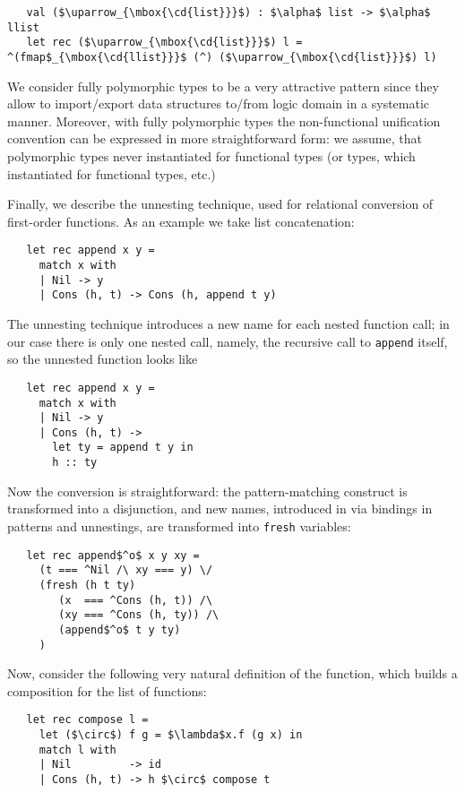 \begin{lstlisting}
   val ($\uparrow_{\mbox{\cd{list}}}$) : $\alpha$ list -> $\alpha$ llist
   let rec ($\uparrow_{\mbox{\cd{list}}}$) l = ^(fmap$_{\mbox{\cd{llist}}}$ (^) ($\uparrow_{\mbox{\cd{list}}}$) l)
\end{lstlisting}

We consider fully polymorphic types to be a very attractive pattern since they allow to import/export
data structures to/from logic domain in a systematic manner. Moreover, with fully polymorphic types the non-functional
unification convention can be expressed in more straightforward form: we assume, that polymorphic types never
instantiated for functional types (or types, which instantiated for functional types, etc.)

Finally, we describe the unnesting technique, used for relational conversion of first-order functions. As an example we take
list concatenation:

\begin{lstlisting}
   let rec append x y =
     match x with
     | Nil -> y
     | Cons (h, t) -> Cons (h, append t y)
\end{lstlisting}

The unnesting technique introduces a new name for each nested function call; in our case there is only one nested call, namely,
the recursive call to \lstinline|append| itself, so the unnested function looks like

\begin{lstlisting}
   let rec append x y =
     match x with 
     | Nil -> y
     | Cons (h, t) -> 
       let ty = append t y in
       h :: ty
\end{lstlisting}

Now the conversion is straightforward: the pattern-matching construct is transformed into a disjunction, and new names, 
introduced in via bindings in patterns and unnestings, are transformed into \lstinline|fresh| variables:

\begin{lstlisting}
   let rec append$^o$ x y xy =
     (t === ^Nil /\ xy === y) \/
     (fresh (h t ty)
        (x  === ^Cons (h, t)) /\
        (xy === ^Cons (h, ty)) /\
        (append$^o$ t y ty)
     )
\end{lstlisting}

Now, consider the following very natural definition of the function, which builds a composition for the
list of functions:

\begin{lstlisting}
   let rec compose l =
     let ($\circ$) f g = $\lambda$x.f (g x) in
     match l with
     | Nil         -> id
     | Cons (h, t) -> h $\circ$ compose t
\end{lstlisting}

